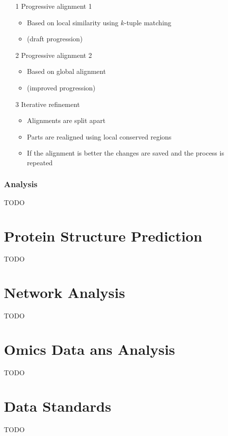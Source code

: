 \documentclass[a4paper]{article}
\begin{document}
\begin{itemize}
  \item[1]
    Progressive alignment 1

    \begin{itemize}
      \item
        Based on local similarity using $k$-tuple matching

      \item
        (draft progression)
    \end{itemize}

  \item[2]
    Progressive alignment 2

    \begin{itemize}
      \item
        Based on global alignment

      \item
        (improved progression)
    \end{itemize}

  \item[3]
    Iterative refinement

    \begin{itemize}
      \item
        Alignments are split apart

      \item
        Parts are realigned using local conserved regions

      \item
        If the alignment is better the changes are saved and the process is
        repeated
    \end{itemize}
\end{itemize}

\subsubsection{Analysis}

TODO

\section{Protein Structure Prediction}

TODO

\section{Network Analysis}

TODO

\section{Omics Data ans Analysis}

TODO

\section{Data Standards}

TODO
\end{document}
